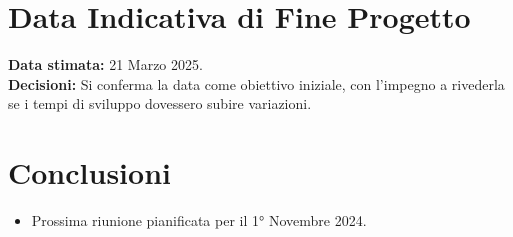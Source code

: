 \documentclass{article}
\begin{document}
\section{Data Indicativa di Fine Progetto}
\textbf{Data stimata:} 21 Marzo 2025. \\
\textbf{Decisioni:} Si conferma la data come obiettivo iniziale, con l’impegno a rivederla se i tempi di sviluppo dovessero subire variazioni.

\section*{Conclusioni}
\begin{itemize}
    \item Prossima riunione pianificata per il 1° Novembre 2024.
\end{itemize}
\end{document}
